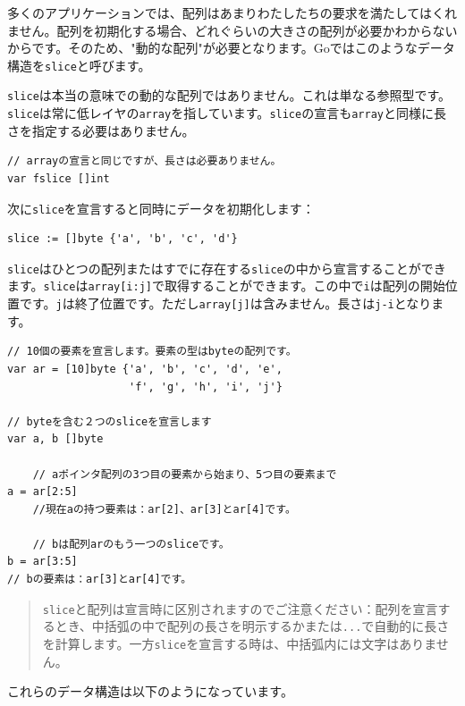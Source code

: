 多くのアプリケーションでは、配列はあまりわたしたちの要求を満たしてはくれません。配列を初期化する場合、どれぐらいの大きさの配列が必要かわからないからです。そのため、"動的な配列"が必要となります。Goではこのようなデータ構造を\texttt{slice}と呼びます。

\texttt{slice}は本当の意味での動的な配列ではありません。これは単なる参照型です。\texttt{slice}は常に低レイヤの\texttt{array}を指しています。\texttt{slice}の宣言も\texttt{array}と同様に長さを指定する必要はありません。

\begin{lstlisting}[numbers=none]
// arrayの宣言と同じですが、長さは必要ありません。
var fslice []int
\end{lstlisting}

次に\texttt{slice}を宣言すると同時にデータを初期化します：

\begin{lstlisting}[numbers=none]
slice := []byte {'a', 'b', 'c', 'd'}
\end{lstlisting}

\texttt{slice}はひとつの配列またはすでに存在する\texttt{slice}の中から宣言することができます。\texttt{slice}は\texttt{array[i:j]}で取得することができます。この中で\texttt{i}は配列の開始位置です。\texttt{j}は終了位置です。ただし\texttt{array[j]}は含みません。長さは\texttt{j-i}となります。

\begin{lstlisting}[numbers=none]
// 10個の要素を宣言します。要素の型はbyteの配列です。
var ar = [10]byte {'a', 'b', 'c', 'd', 'e',
                   'f', 'g', 'h', 'i', 'j'}

// byteを含む２つのsliceを宣言します
var a, b []byte

    // aポインタ配列の3つ目の要素から始まり、5つ目の要素まで
a = ar[2:5]
    //現在aの持つ要素は：ar[2]、ar[3]とar[4]です。

    // bは配列arのもう一つのsliceです。
b = ar[3:5]
// bの要素は：ar[3]とar[4]です。
\end{lstlisting}

\begin{quote}
  \texttt{slice}と配列は宣言時に区別されますのでご注意ください：配列を宣言するとき、中括弧の中で配列の長さを明示するかまたは\texttt{...}で自動的に長さを計算します。一方\texttt{slice}を宣言する時は、中括弧内には文字はありません。
\end{quote}

これらのデータ構造は以下のようになっています。

